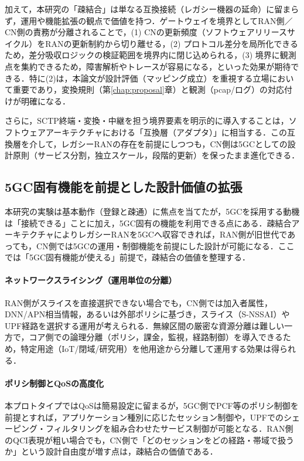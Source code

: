 加えて，本研究の「疎結合」は単なる互換接続（レガシー機器の延命）に留まらず，運用や機能拡張の観点で価値を持つ．ゲートウェイを境界としてRAN側／CN側の責務が分離されることで，(1) CNの更新頻度（ソフトウェアリリースサイクル）をRANの更新制約から切り離せる，(2) プロトコル差分を局所化できるため，差分吸収ロジックの検証範囲を境界内に閉じ込められる，(3) 境界に観測点を集約できるため，障害解析やトレースが容易になる，といった効果が期待できる．特に(2)は，本論文が設計評価（マッピング成立）を重視する立場において重要であり，変換規則（第\ref{chap:proposal}章）と観測（pcap/ログ）の対応付けが明確になる．

さらに，SCTP終端・変換・中継を担う境界要素を明示的に導入することは，ソフトウェアアーキテクチャにおける「互換層（アダプタ）」に相当する．この互換層を介して，レガシーRANの存在を前提にしつつも，CN側は5GCとしての設計原則（サービス分割，独立スケール，段階的更新）を保ったまま進化できる．

\subsection{5GC固有機能を前提とした設計価値の拡張}
本研究の実験は基本動作（登録と疎通）に焦点を当てたが，5GCを採用する動機は「接続できる」ことに加え，5GC固有の機能を利用できる点にある．疎結合アーキテクチャによりレガシーRANを5GCへ収容できれば，RAN側が旧世代であっても，CN側では5GCの運用・制御機能を前提にした設計が可能になる．ここでは「5GC固有機能が使える」前提で，疎結合の価値を整理する．

\paragraph{ネットワークスライシング（運用単位の分離）}
RAN側がスライスを直接選択できない場合でも，CN側では加入者属性，DNN/APN相当情報，あるいは外部ポリシに基づき，スライス（S-NSSAI）やUPF経路を選択する運用が考えられる．無線区間の厳密な資源分離は難しい一方で，コア側での論理分離（ポリシ，課金，監視，経路制御）を導入できるため，特定用途（IoT/閉域/研究用）を他用途から分離して運用する効果は得られる．

\paragraph{ポリシ制御とQoSの高度化}
本プロトタイプではQoSは簡易設定に留まるが，5GC側でPCF等のポリシ制御を前提とすれば，アプリケーション種別に応じたセッション制御や，UPFでのシェーピング・フィルタリングを組み合わせたサービス制御が可能となる．RAN側のQCI表現が粗い場合でも，CN側で「どのセッションをどの経路・帯域で扱うか」という設計自由度が増す点は，疎結合の価値である．

